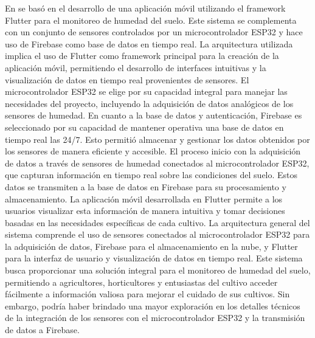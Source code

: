 \bigbreak
En \cite{ramos_galindo_diseno_2023} se basó en el desarrollo de una aplicación móvil utilizando el framework Flutter para el monitoreo de humedad del suelo. Este sistema se complementa con un conjunto de sensores controlados por un microcontrolador ESP32 y hace uso de Firebase como base de datos en tiempo real. La arquitectura utilizada implica el uso de Flutter como framework principal para la creación de la aplicación móvil, permitiendo el desarrollo de interfaces intuitivas y la visualización de datos en tiempo real provenientes de sensores. El microcontrolador ESP32 se elige por su capacidad integral para manejar las necesidades del proyecto, incluyendo la adquisición de datos analógicos de los sensores de humedad. En cuanto a la base de datos y autenticación, Firebase es seleccionado por su capacidad de mantener operativa una base de datos en tiempo real las 24/7. Esto permitió almacenar y gestionar los datos obtenidos por los sensores de manera eficiente y accesible. El proceso inicio con la adquisición de datos a través de sensores de humedad conectados al microcontrolador ESP32, que capturan información en tiempo real sobre las condiciones del suelo. Estos datos se transmiten a la base de datos en Firebase para su procesamiento y almacenamiento. La aplicación móvil desarrollada en Flutter permite a los usuarios visualizar esta información de manera intuitiva y tomar decisiones basadas en las necesidades específicas de cada cultivo. La arquitectura general del sistema comprende el uso de sensores conectados al microcontrolador ESP32 para la adquisición de datos, Firebase para el almacenamiento en la nube, y Flutter para la interfaz de usuario y visualización de datos en tiempo real. Este sistema busca proporcionar una solución integral para el monitoreo de humedad del suelo, permitiendo a agricultores, horticultores y entusiastas del cultivo acceder fácilmente a información valiosa para mejorar el cuidado de sus cultivos. Sin embargo, podría haber brindado una mayor exploración en los detalles técnicos de la integración de los sensores con el microcontrolador ESP32 y la transmisión de datos a Firebase.

